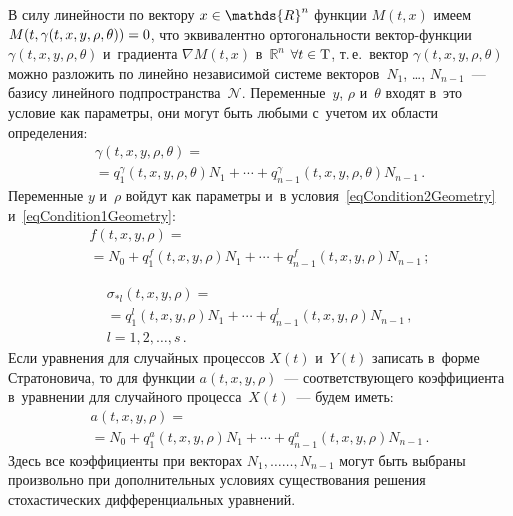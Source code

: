 \begin{multicols}{2}
В силу линейности по вектору $x \hm\in \mathds{R}^n$ функции $M(t,x)$ 
имеем $M(t,\gamma(t,x,y,\rho,\theta))\hm = 0$, что эквивалентно ортогональности 
век\-тор-функ\-ции $\gamma(t,x,y,\rho,\theta)$ и~градиента $\nabla M(t,x)$ 
в~$\mathds{R}^n$ $\forall t \hm\in \mathrm{T}$, т.\,е.\ вектор 
$\gamma(t,x,y,\rho,\theta)$ можно разложить по линейно независимой 
системе векторов~$N_1$, \dots, $N_{n-1}$~--- базису линейного 
подпространства~$\mathcal{N}$. Переменные~$y$, $\rho$ и~$\theta$ 
входят в~это условие как параметры, они могут быть любыми с~учетом их 
области определения:
\begin{multline*}
  \gamma(t,x,y,\rho,\theta) ={}\\
  {}= q_1^\gamma(t,x,y,\rho,\theta) N_1 + 
  \cdots + q_{n-1}^\gamma(t,x,y,\rho,\theta) N_{n-1}\,.
\end{multline*}
Переменные $y$ и~$\rho$ войдут как параметры и~в условия~\eqref{eqCondition2Geometry} 
и~\eqref{eqCondition1Geometry}:
\begin{multline*}
  f(t,x,y,\rho) ={}\\
  {}= N_0 + q_1^f(t,x,y,\rho) N_1 + \cdots + q_{n-1}^f(t,x,y,\rho) N_{n-1}\,;
\end{multline*}

\vspace*{-12pt}

\noindent
\begin{multline*}
  \sigma_{* l}(t,x,y,\rho) = {}\\
  {}=q_1^l(t,x,y,\rho) N_1 + 
  \cdots + q_{n-1}^l(t,x,y,\rho) N_{n-1}\,,\\
   l = 1,2,\dots,s\,.
\end{multline*}
Если уравнения для случайных процессов $X(t)$ и~$Y(t)$ записать в~форме 
Стратоновича, то для функции $a(t,x,y,\rho)$~--- соответствующего коэффициента 
в~уравнении для случайного процесса~$X(t)$~--- будем иметь:
\begin{multline*}
  a(t,x,y,\rho) ={}\\
  {}= N_0 + q_1^a(t,x,y,\rho) N_1 + \cdots + 
  q_{n-1}^a(t,x,y,\rho) N_{n-1}\,.
\end{multline*}
Здесь все коэффициенты при векторах $N_1, \ldots$\linebreak $\ldots, N_{n-1}$ могут быть выбраны 
произвольно при дополнительных условиях существования решения 
стохастических дифференциальных уравнений.


\end{multicols}
